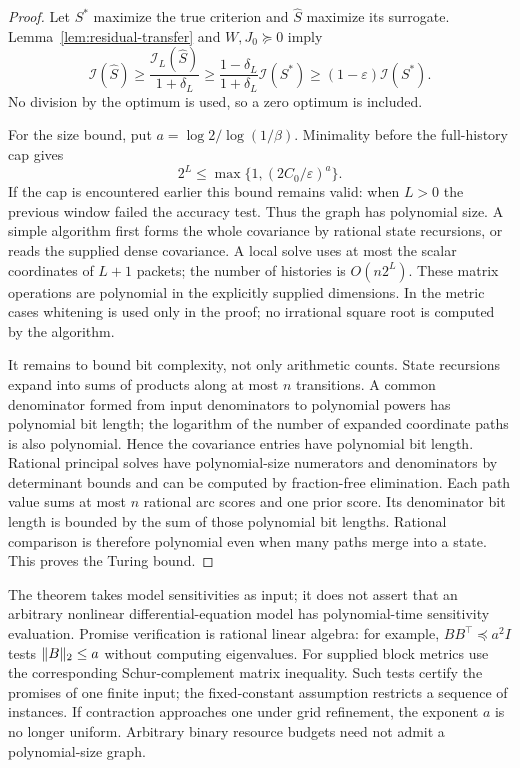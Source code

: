 \begin{proof}
Let $S^*$ maximize the true criterion and $\widehat S$ maximize its
surrogate. Lemma~\ref{lem:residual-transfer} and $W,J_0\succeq0$ imply
\begin{equation}
 \mathcal I(\widehat S)\ge
 \frac{\mathcal I_L(\widehat S)}{1+\delta_L}\ge
 \frac{1-\delta_L}{1+\delta_L}\mathcal I(S^*)
 \ge(1-\varepsilon)\mathcal I(S^*).
 \label{eq:trace-approximation-ratio}
\end{equation}
No division by the optimum is used, so a zero optimum is included.

For the size bound, put $a=\log2/\log(1/\beta)$. Minimality before the
full-history cap gives
\[
 2^L\le\max\{1,(2C_0/\varepsilon)^a\}.
\]
If the cap is encountered earlier this bound remains valid: when $L>0$ the
previous window failed the accuracy test. Thus the graph has polynomial
size. A simple algorithm first forms the whole covariance by rational state
recursions, or reads the supplied dense covariance. A local solve uses at most
the scalar coordinates of $L+1$ packets; the number of histories is
$O(n2^L)$. These matrix operations are polynomial in the explicitly supplied
dimensions. In the metric cases whitening is used only in the proof; no
irrational square root is computed by the algorithm.

It remains to bound bit complexity, not only arithmetic counts.
State recursions expand into sums of products along at most $n$ transitions.
A common denominator formed from input denominators to polynomial powers has
polynomial bit length; the logarithm of the number of expanded coordinate
paths is also polynomial. Hence the covariance entries have polynomial bit
length. Rational principal solves have polynomial-size numerators and
denominators by determinant bounds and can be computed by fraction-free
elimination. Each path value sums at most $n$ rational arc scores and one
prior score. Its denominator bit length is bounded by the sum of those
polynomial bit lengths. Rational comparison is therefore polynomial even
when many paths merge into a state. This proves the Turing bound.
\end{proof}

The theorem takes model sensitivities as input; it does not assert that an
arbitrary nonlinear differential-equation model has polynomial-time sensitivity
evaluation. Promise verification is rational linear algebra: for example,
$B B^\top\preceq a^2I$ tests $\lVert B\rVert_2\le a$ without computing eigenvalues.
For supplied block metrics use the corresponding Schur-complement matrix
inequality. Such tests certify the promises of one finite input; the
fixed-constant assumption restricts a sequence of instances. If contraction
approaches one under grid refinement, the exponent $a$ is no longer uniform.
Arbitrary binary resource budgets need not admit a polynomial-size graph.

